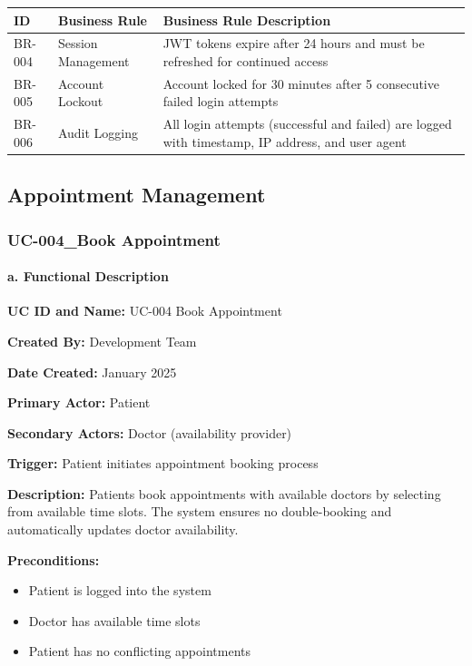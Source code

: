 \documentclass[12pt,a4paper]{article}
\begin{document}
\begin{longtable}{|p{2cm}|p{4cm}|p{8cm}|}
\hline
\textbf{ID} & \textbf{Business Rule} & \textbf{Business Rule Description} \\
\hline
BR-004 & Session Management & JWT tokens expire after 24 hours and must be refreshed for continued access \\
\hline
BR-005 & Account Lockout & Account locked for 30 minutes after 5 consecutive failed login attempts \\
\hline
BR-006 & Audit Logging & All login attempts (successful and failed) are logged with timestamp, IP address, and user agent \\
\hline
\end{longtable}

\subsection{Appointment Management}

\subsubsection{UC-004\_Book Appointment}

\paragraph{a. Functional Description}

\textbf{UC ID and Name:} UC-004 Book Appointment

\textbf{Created By:} Development Team

\textbf{Date Created:} January 2025

\textbf{Primary Actor:} Patient

\textbf{Secondary Actors:} Doctor (availability provider)

\textbf{Trigger:} Patient initiates appointment booking process

\textbf{Description:} Patients book appointments with available doctors by selecting from available time slots. The system ensures no double-booking and automatically updates doctor availability.

\textbf{Preconditions:}
\begin{itemize}
    \item Patient is logged into the system
    \item Doctor has available time slots
    \item Patient has no conflicting appointments
\end{itemize}
\end{document}
